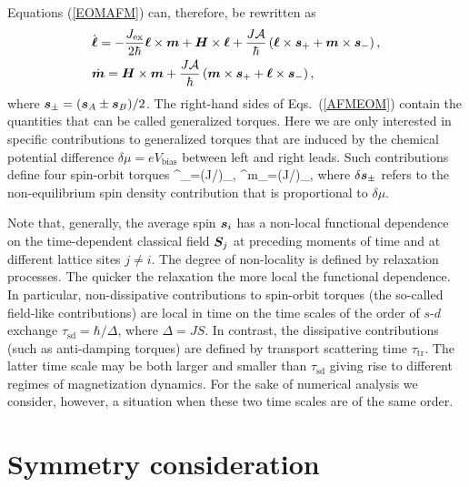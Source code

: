 Equations (\ref{EOMAFM}) can, therefore, be rewritten as
\begin{align}
&\dot{\boldsymbol{\ell}} = -\frac{J_\textrm{ex}}{2\hbar} \boldsymbol{\ell}\times\boldsymbol{m} +\boldsymbol{H}\times\boldsymbol{\ell}+\frac{J\mathcal{A}}{\hbar}\left(\boldsymbol{\ell}\times\boldsymbol{s}_++\boldsymbol{m}\times\boldsymbol{s}_-\right),\nonumber\\
&\dot{\boldsymbol{m}} = \boldsymbol{H}\times\boldsymbol{m}+\frac{J\mathcal{A}}{\hbar}\left(\boldsymbol{m}\times\boldsymbol{s}_++\boldsymbol{\ell}\times\boldsymbol{s}_-\right),
\label{AFMEOM}
\end{align}
where $\boldsymbol{s}_\pm=(\boldsymbol{s}_A\pm\boldsymbol{s}_B)/2$. The right-hand sides of Eqs.~(\ref{AFMEOM}) contain the quantities that can be called generalized torques. Here we are only interested in specific contributions to generalized torques that are induced by the chemical potential difference $\delta\mu=eV_\textrm{bias}$ between left and right leads. Such contributions define four spin-orbit torques  
\be
\label{SOT_def}
^\ell_\pm=(J/\hbar)\bb{\ell}\times\delta{}_\pm, \quad 
{}^m_\pm=(J/\hbar)\times\delta{}_\pm,
\e
where $\delta \boldsymbol{s}_\pm$ refers to the non-equilibrium spin density contribution that is proportional to $\delta\mu$. 

Note that, generally, the average spin $\boldsymbol{s}_i$ has a non-local functional dependence on the time-dependent classical field $\boldsymbol{S}_j$ at preceding moments of time  and at different lattice sites $j\neq i$. The degree of non-locality is defined by relaxation processes. The quicker the relaxation the more local the functional dependence. In particular, non-dissipative contributions to spin-orbit torques (the so-called field-like contributions) are local in time on the time scales of the order of $s$-$d$ exchange  $\tau_\textrm{sd}=\hbar/\Delta$, where $\Delta=J S$. In contrast, the dissipative contributions (such as anti-damping torques) are defined by transport scattering time $\tau_\textrm{tr}$. The latter time scale may be both larger and smaller than $\tau_\textrm{sd}$ giving rise to different regimes of magnetization dynamics. For the sake of numerical analysis we consider, however, a situation when these two time scales are of the same order.

\section{Symmetry consideration} 

